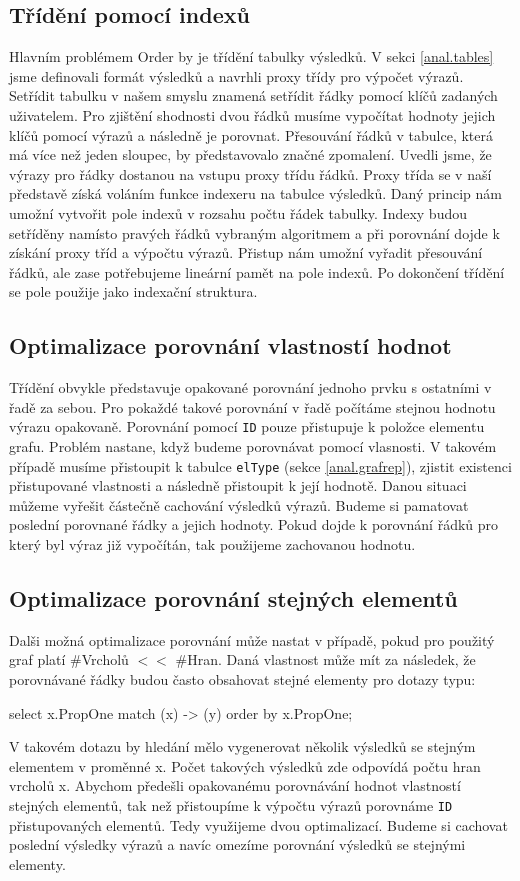 \subsection{Třídění pomocí indexů}

Hlavním problémem Order by je třídění tabulky výsledků.
V sekci \ref{anal.tables} jsme definovali formát výsledků a navrhli proxy třídy pro výpočet výrazů.
Setřídit tabulku v našem smyslu znamená setřídit řádky pomocí klíčů zadaných uživatelem.
Pro zjištění shodnosti dvou řádků musíme vypočítat hodnoty jejich klíčů pomocí výrazů a následně je porovnat.
Přesouvání řádků v tabulce, která má více než jeden sloupec, by představovalo značné zpomalení.
Uvedli jsme, že výrazy pro řádky dostanou na vstupu proxy třídu řádků.
Proxy třída se v naší představě získá voláním funkce indexeru na tabulce výsledků.
Daný princip nám umožní vytvořit pole indexů v rozsahu počtu řádek tabulky.
Indexy budou setříděny namísto pravých řádků vybraným algoritmem a při porovnání dojde k získání proxy tříd a výpočtu výrazů.
Přistup nám umožní vyřadit přesouvání řádků, ale zase potřebujeme lineární pamět na pole indexů.
Po dokončení třídění se pole použije jako indexační struktura.

\subsection{Optimalizace porovnání vlastností hodnot} \label{anal.order.opt1}

Třídění obvykle představuje opakované porovnání jednoho prvku s ostatními v řadě za sebou.
Pro pokaždé takové porovnání v řadě počítáme stejnou hodnotu výrazu opakovaně.
Porovnání pomocí \texttt{ID} pouze přistupuje k položce elementu grafu.
Problém nastane, když budeme porovnávat pomocí vlasnosti.
V takovém případě musíme přistoupit k tabulce \texttt{elType} (sekce \ref{anal.grafrep}), zjistit existenci přistupované vlastnosti a následně přistoupit k její hodnotě.
Danou situaci můžeme vyřešit částečně cachování výsledků výrazů.
Budeme si pamatovat poslední porovnané řádky a jejich hodnoty.
Pokud dojde k porovnání řádků pro který byl výraz již vypočítán, tak použijeme zachovanou hodnotu.

\subsection{Optimalizace porovnání stejných elementů}

Dalši možná optimalizace porovnání může nastat v případě, pokud pro použitý graf platí \#Vrcholů $<<$ \#Hran.
Daná vlastnost může mít za následek, že porovnávané řádky budou často obsahovat stejné elementy pro dotazy typu:
\begin{code}
select x.PropOne match (x) -> (y) order by x.PropOne;
\end{code}
V takovém dotazu by hledání mělo vygenerovat několik výsledků se stejným elementem v proměnné x.
Počet takových výsledků zde odpovídá počtu hran vrcholů x.
Abychom předešli opakovanému porovnávání hodnot vlastností stejných elementů, tak než přistoupíme k výpočtu výrazů porovnáme \texttt{ID} přistupovaných elementů.
Tedy využijeme dvou optimalizací.
Budeme si cachovat poslední výsledky výrazů a navíc omezíme porovnání výsledků se stejnými elementy.

